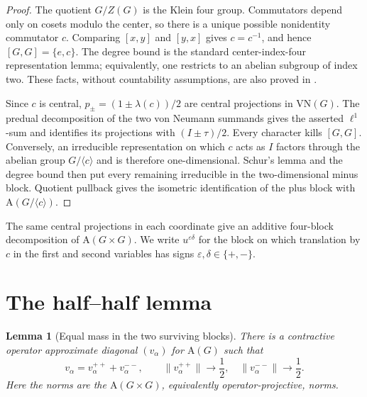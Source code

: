 \documentclass[11pt]{article}
\newtheorem{lemma}[theorem]{Lemma}
\newcommand{\A}{\mathrm A}
\newcommand{\VN}{\mathrm {VN}}
\newcommand{\norm}[1]{\lVert #1\rVert}
\begin{document}
\begin{proof}
The quotient $G/Z(G)$ is the Klein four group.  Commutators depend only on
cosets modulo the center, so there is a unique possible nonidentity
commutator $c$.  Comparing $[x,y]$ and $[y,x]$ gives $c=c^{-1}$, and hence
$[G,G]=\{e,c\}$.  The degree bound is the standard center-index-four
representation lemma; equivalently, one restricts to an abelian subgroup of
index two.  These facts, without countability assumptions, are also proved in
\cite[Theorem 4.6]{Choi2023}.

Since $c$ is central, $p_\pm=(1\pm\lambda(c))/2$ are central projections in
$\VN(G)$.  The predual decomposition of the two von Neumann summands gives
the asserted $\ell^1$-sum and identifies its projections with
$(I\pm\tau)/2$.  Every character kills $[G,G]$.  Conversely, an irreducible
representation on which $c$ acts as $I$ factors through the abelian group
$G/\langle c\rangle$ and is therefore one-dimensional.  Schur's lemma and
the degree bound then put every remaining irreducible in the two-dimensional
minus block.  Quotient pullback gives the isometric identification of the
plus block with $\A(G/\langle c\rangle)$.
\end{proof}

The same central projections in each coordinate give an additive four-block
decomposition of $\A(G\times G)$.  We write $u^{\varepsilon\delta}$ for the
block on which translation by $c$ in the first and second variables has signs
$\varepsilon,\delta\in\{+,-\}$.

\section{The half--half lemma}

\begin{lemma}[Equal mass in the two surviving blocks]\label{lem:half}
There is a contractive operator approximate diagonal $(v_\alpha)$ for
$\A(G)$ such that
\[
 v_\alpha=v_\alpha^{++}+v_\alpha^{--},\qquad
 \norm{v_\alpha^{++}}\longrightarrow\frac12,
 \quad
 \norm{v_\alpha^{--}}\longrightarrow\frac12.
\]
Here the norms are the $\A(G\times G)$, equivalently operator-projective,
norms.
\end{lemma}
\end{document}
